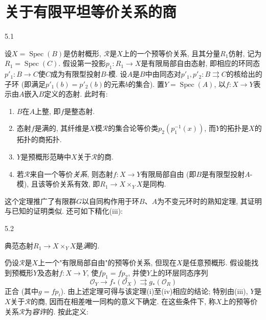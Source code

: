 \chapter{关于有限平坦等价关系的商}\thispagestyle{fancy}\label{fga3.iii-5}
\begin{theorem}{5.1}\label{fga3.iii-5-theorem-5.1}\skipsinglepar
\par{}设\(X=\operatorname {Spec}(B)\)是仿射概形, \(\mathcal {R}\)是\(X\)上的一个预等价关系, 且其分量\(R_1\)仿射, 记为\(R_1=\operatorname {Spec}(C)\). 假设第一投影\(p_1\colon  R_1\to  X\)是有限局部自由态射, 即相应的环同态\(p'_1\colon  B\to  C\)使\(C\)成为有限型投射\(B\)-模. 设\(A\)是\(B\)中由同态对\(p'_1,p'_2\colon  B\rightrightarrows  C\)的核给出的子环 (即满足\(p'_1(b)=p'_2(b)\)的元素\(b\)的集合). 置\(Y=\operatorname {Spec}(A)\), 以\(f\colon  X\to  Y\)表示由\(A\)嵌入\(B\)定义的态射. 此时有: 
\begin{enumerate}
      
 \item[i.]\(B\)在\(A\)上整, 即\(f\)是整态射.

      
 \item[ii.]态射\(f\)是满的, 其纤维是\(X\)模\(\mathcal {R}\)的集合论等价类\(p_2(p_1^{-1}(x))\), 而\(Y\)的拓扑是\(X\)的拓扑的商拓扑.

      
 \item[iii.]\(Y\)是预概形范畴中\(X\)关于\(\mathcal {R}\)的商.

      
 \item[iv.]若\(\mathcal {R}\)来自一个等价\emph{关系}, 则态射\(f\colon  X\to  Y\)有限局部自由 (即\(B\)是有限型投射\(A\)-模), 且该等价关系有效, 即\(R_1\to  X\times _Y X\)是同构.

    
\end{enumerate}
\end{theorem}
\par{}这个定理推广了有限群\(G\)以自同构作用于环\(B\)、\(A\)为不变元环时的熟知定理, 其证明与已知的证明类似. 还可如下精化(iii):
\begin{corollary}{5.2}\label{fga3.iii-5-corollary-5.2}\skipsinglepar
\par{}典范态射\(R_1\to  X\times _Y X\)是\emph{满}的.
\end{corollary}
\par{}仍设\(\mathcal {R}\)是\(X\)上一个"有限局部自由"的预等价关系, 但现在\(X\)是任意预概形. 假设能找到预概形\(Y\)及态射\(f\colon  X\to  Y\), 使\(fp_1=fp_2\), 并使\(Y\)上的环层同态序列\[     \mathcal {O}_Y \to  f_*(\mathcal {O}_X) \rightrightarrows  g_*(\mathcal {O}_R)   \]正合 (其中\(g=fp_i\)). 由上述定理可得与该定理(i)至(iv)相应的结论; 特别由(iii), \(Y\)是\(X\)关于\(\mathcal {R}\)的商, 因而在相差唯一同构的意义下确定. 在这些条件下, 称\(X\)上的预等价关系\(\mathcal {R}\)为\emph{容许}的. 按此定义:
